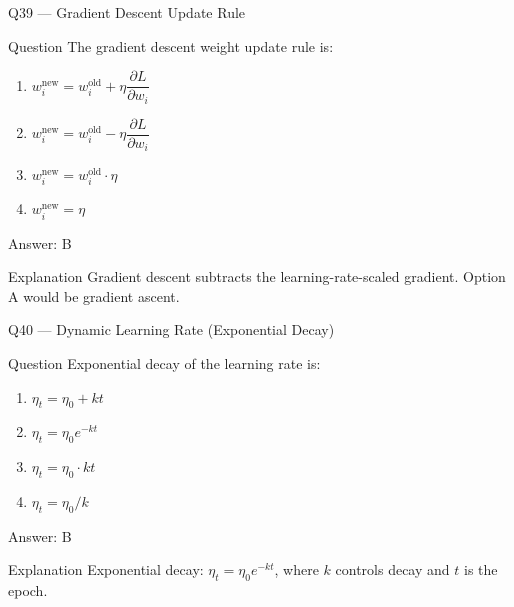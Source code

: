 \documentclass[aspectratio=169,8pt]{beamer}
\begin{document}
	\begin{frame}{Q39 --- Gradient Descent Update Rule}
		\begin{block}{Question}
			The gradient descent weight update rule is:
			\begin{enumerate}
				\item $w_i^{\text{new}} = w_i^{\text{old}} + \eta \dfrac{\partial L}{\partial w_i}$
				\item $w_i^{\text{new}} = w_i^{\text{old}} - \eta \dfrac{\partial L}{\partial w_i}$
				\item $w_i^{\text{new}} = w_i^{\text{old}} \cdot \eta$
				\item $w_i^{\text{new}} = \eta$
			\end{enumerate}
		\end{block}
		\begin{exampleblock}{Answer: B}\end{exampleblock}
		\begin{block}{Explanation}
			Gradient descent subtracts the learning-rate-scaled gradient. Option A would be gradient ascent.
		\end{block}
	\end{frame}
	
	\begin{frame}{Q40 --- Dynamic Learning Rate (Exponential Decay)}
		\begin{block}{Question}
			Exponential decay of the learning rate is:
			\begin{enumerate}
				\item $\eta_t = \eta_0 + k t$
				\item $\eta_t = \eta_0 e^{-kt}$
				\item $\eta_t = \eta_0 \cdot k t$
				\item $\eta_t = \eta_0 / k$
			\end{enumerate}
		\end{block}
		\begin{exampleblock}{Answer: B}\end{exampleblock}
		\begin{block}{Explanation}
			Exponential decay: $\eta_t = \eta_0 e^{-kt}$, where $k$ controls decay and $t$ is the epoch.
		\end{block}
	\end{frame}
	
\end{document}
